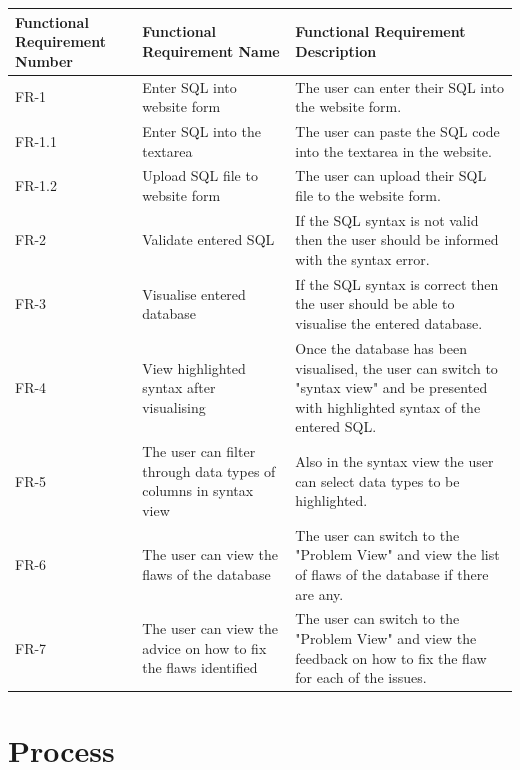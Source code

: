 \begin{center}
	\setlength\extrarowheight{2pt}
	\begin{tabularx}{\textwidth}{|X|X|X|}
		
		\hline
		\textbf{Functional Requirement Number} & \textbf{Functional Requirement Name} & \textbf{Functional Requirement Description} \\
		\hline
		FR-1 & Enter SQL into website form & The user can enter their SQL into the website form. \\
		\hline
		FR-1.1 & Enter SQL into the textarea & The user can paste the SQL code into the textarea in the website. \\
		\hline
		FR-1.2 & Upload SQL file to website form & The user can upload their SQL file to the website form. \\
		\hline
		FR-2 & Validate entered SQL & If the SQL syntax is not valid then the user should be informed with the syntax error. \\
		\hline
		FR-3 & Visualise entered database & If the SQL syntax is correct then the user should be able to visualise the entered database. \\
		\hline
		FR-4 & View highlighted syntax after visualising & Once the database has been visualised, the user can switch to "syntax view" and be presented with highlighted syntax of the entered SQL. \\
		\hline
		FR-5 & The user can filter through data types of columns in syntax view & Also in the syntax view the user can select data types to be highlighted. \\
		\hline
		FR-6 & The user can view the flaws of the database & The user can switch to the "Problem View" and view the list of flaws of the database if there are any. \\
		\hline
		FR-7 & The user can view the advice on how to fix the flaws identified & The user can switch to the "Problem View" and view the feedback on how to fix the flaw for each of the issues. \\
		\hline
	\end{tabularx}
\end{center}

\newpage

\section{Process}
\label{sec:process}

